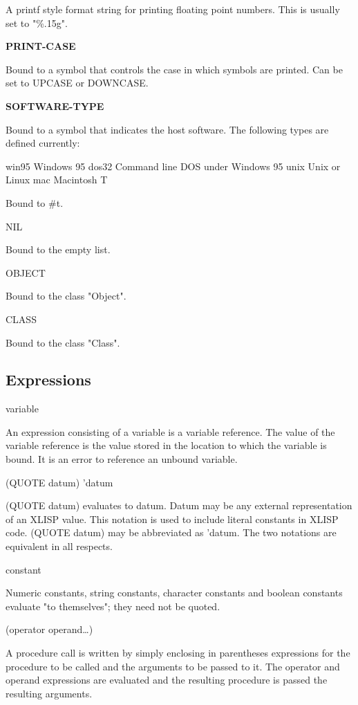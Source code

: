 \documentclass[11pt]{article}
\begin{document}
A printf style format string for printing floating point numbers.  This
is usually set to "\%.15g".

\textbf{PRINT-CASE}

Bound to a symbol that controls the case in which symbols are printed.
Can be set to UPCASE or DOWNCASE.

\textbf{SOFTWARE-TYPE}

Bound to a symbol that indicates the host software.  The following types
are defined currently:

    win95    Windows 95
    dos32    Command line DOS under Windows 95
    unix    Unix or Linux
    mac    Macintosh
T

Bound to \#t.

NIL

Bound to the empty list.

OBJECT

Bound to the class "Object".

CLASS

Bound to the class "Class".

\subsection{Expressions}
\label{sec-1-5}

variable

An expression consisting of a variable is a variable reference. The
value of the variable reference is the value stored in the location to
which the variable is bound. It is an error to reference an unbound
variable.

(QUOTE datum)
'datum

(QUOTE datum) evaluates to datum. Datum may be any external
representation of an XLISP value. This notation is used to include
literal constants in XLISP code. (QUOTE datum) may be abbreviated as
'datum. The two notations are equivalent in all respects.

constant

Numeric constants, string constants, character constants and boolean
constants evaluate "to themselves"; they need not be quoted.

(operator operand\ldots{})

A procedure call is written by simply enclosing in parentheses
expressions for the procedure to be called and the arguments to be
passed to it. The operator and operand expressions are evaluated and the
resulting procedure is passed the resulting arguments.
\end{document}
